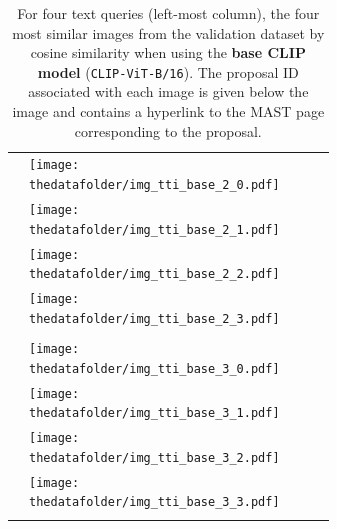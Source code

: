 \documentclass[10pt]{article} %
\begin{document}
\begin{table}[h!]
\begin{tabular}{m{2.7cm} p{2.9cm} p{2.9cm} p{2.9cm} p{2.9cm}}
      \midrule
      \texttt{} \vspace{20mm} & \centering \texttt{[image: \\thedatafolder/img\_tti\_base\_2\_0.pdf]} \\  & \centering \texttt{[image: \\thedatafolder/img\_tti\_base\_2\_1.pdf]} \\  & \centering \texttt{[image: \\thedatafolder/img\_tti\_base\_2\_2.pdf]} \\  & \centering \texttt{[image: \\thedatafolder/img\_tti\_base\_2\_3.pdf]} \\   \tabularnewline
      \midrule
      \texttt{} \vspace{20mm} & \centering \texttt{[image: \\thedatafolder/img\_tti\_base\_3\_0.pdf]} \\  & \centering \texttt{[image: \\thedatafolder/img\_tti\_base\_3\_1.pdf]} \\  & \centering \texttt{[image: \\thedatafolder/img\_tti\_base\_3\_2.pdf]} \\  & \centering \texttt{[image: \\thedatafolder/img\_tti\_base\_3\_3.pdf]} \\   \tabularnewline
      \bottomrule
  \end{tabular}
  \caption{For four text queries (left-most column), the four most similar images from the validation dataset by cosine similarity when using the \textbf{\textcolor{deeppurple}{base CLIP model}} (\texttt{CLIP-ViT-B/16}). The proposal ID associated with each image is given below the image and contains a hyperlink to the MAST page corresponding to the proposal.}
  \label{tab:tti_base}
\end{table}
\end{document}
